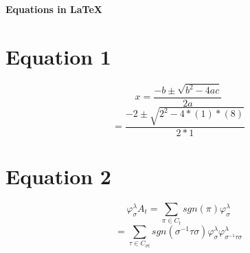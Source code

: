 \documentclass[10pt,a4paper]{article}
\begin{document}
\begin{center}
    \large{\textbf{Equations in \LaTeX}}
\end{center}

\section*{Equation 1}
\begin{fleqn}
\[
x=\frac{-b \pm \sqrt{b^{2}-4ac}}{2a}
\]
\[
=\frac{-2 \pm \sqrt{2^{2}-4*(1)*(8)}}{2*1}
\]
\end{fleqn}

\section*{Equation 2}
\begin{fleqn}
\[
\varphi^{\lambda}_{\sigma}A_{t}=\sum_{\pi \in C_{t}} sgn(\pi)\varphi^{\lambda}_{\sigma}
\]
\[
=\sum_{\tau \in C_{\sigma t}} sgn(\sigma^{-1}\tau\sigma)\varphi^{\lambda}_{\sigma}\varphi^{\lambda}_{\sigma^{-1}\tau\sigma}
\]
\end{fleqn}
\end{document}
